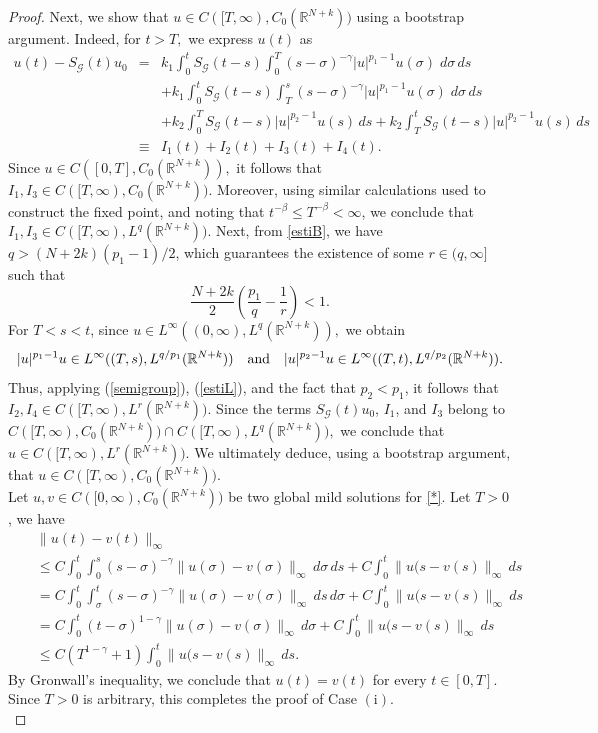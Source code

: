 \documentclass[a4,psfig,english,12pt,epsf,portrait]{article}
\numberwithin{equation}{section}
\newcommand{\abs}[1]{\lvert#1\rvert}
\begin{document}
\begin{proof}
	Next, we show that $u\in C([T,\infty),C_0(\mathbb{R}^{N+k}))$ using a bootstrap argument. Indeed, for $t>T,$ we express $u(t)$ as
	\begin{eqnarray*}
		u(t)-S_{\mathcal{G}}(t)u_0 &=&
		k_1 \int_0^tS_{\mathcal{G}}(t-s)\int_0^T
		(s-\sigma)^{-\gamma}\abs{u}^{p_1-1}u(\sigma)\;d\sigma\,ds\\
		&&+k_1\int_0^tS_{\mathcal{G}}(t-s)\int_T^s(s-\sigma)^{-\gamma}\abs{u}^{p_1-1}u(\sigma)\;d\sigma\,ds\\
		&& +k_2 \int_0^TS_{\mathcal{G}}(t-s)\abs{u}^{p_2-1}u(s)\,ds + k_2\int_T^tS_{\mathcal{G}}(t-s)\abs{u}^{p_2-1}u(s)\,ds \\
		&\equiv& I_1(t)+I_2(t)+I_3(t)+I_4(t).
	\end{eqnarray*}
	Since $u\in C([0,T],C_0(\mathbb{R}^{N+k})),$ it follows that $I_1,I_3\in
	C([T,\infty),C_0(\mathbb{R}^{N+k})).$ Moreover, using similar calculations used to
	construct the fixed point, and noting that $t^{-\beta}\leq
	T^{-\beta}<\infty$, we conclude that $I_1,I_3\in C([T,\infty),L^q(\mathbb{R}^{N+k}))$.
	Next, from \eqref{estiB}, we have $q>(N+2k)(p_1-1)/2$, which guarantees the existence of some $r\in(q,\infty]$ such that
	\begin{equation}\label{estiL}
		\frac{N+2k}{2}\left(\frac{p_1}{q}-\frac{1}{r}\right)<1.
	\end{equation}
	For $T<s<t$, since $u\in
	L^\infty((0,\infty),L^q(\mathbb{R}^{N+k})),$ we obtain
	$$|u|^{p_1-1}u\in L^\infty((T,s),L^{q/p_1}(\mathbb{R}^{N+k}))\quad\hbox{and}\quad |u|^{p_2-1}u\in L^\infty((T,t),L^{q/p_2}(\mathbb{R}^{N+k})).$$
	Thus, applying (\ref{semigroup}), (\ref{estiL}), and the fact that $p_2<p_1$, it follows that $I_2, I_4\in
	C([T,\infty),L^r(\mathbb{R}^{N+k}))$.
	Since the terms $S_{\mathcal{G}}(t)u_0$, $I_1$, and $I_3$ belong to
	$C([T,\infty),C_0(\mathbb{R}^{N+k}))\cap
	C([T,\infty),L^q(\mathbb{R}^{N+k})),$ we conclude that $u\in
	C([T,\infty),L^r(\mathbb{R}^{N+k}))$. We ultimately deduce, using a bootstrap argument, that $u\in
	C([T,\infty),C_0(\mathbb{R}^{N+k})).$ \\	
	 Let $u,v \in C([0,\infty),C_0(\mathbb{R}^{N+k}))$ be two global mild solutions for \eqref{*}. Let $T>0$, we have
	\begin{eqnarray*}
		&&\|u(t)-v(t)\|_{\infty}\\
		&&\leq C
		\int_0^t\int_0^s(s-\sigma)^{-\gamma}
		\|u(\sigma)-v(\sigma)\|_{\infty}\,d\sigma\,ds+C
		\int_0^t
		\|u(s-v(s)\|_{\infty}\,ds\\
		&&=C
		\int_0^t\int_\sigma^t(s-\sigma)^{-\gamma}\|u(\sigma)-
		v(\sigma)\|_{\infty}\,ds\,d\sigma +C
		\int_0^t
		\|u(s-v(s)\|_{\infty}\,ds\\
		&&=C \int_0^t(t-\sigma)^{1-\gamma}\|u(\sigma)-
		v(\sigma)\|_{\infty}\,d\sigma+C
		\int_0^t
		\|u(s-v(s)\|_{\infty}\,ds\\
		&&\leq C\left(T^{1-\gamma}+1
		\right)  \int_0^t
		\|u(s-v(s)\|_{\infty}\,ds.
	\end{eqnarray*}
	By Gronwall's inequality, we conclude that $u(t)=v(t)$ for every $t\in[0,T]$. Since $T>0$ is arbitrary, this completes the proof of Case $(\mathrm{i})$.\\
	

\end{proof}
\end{document}
